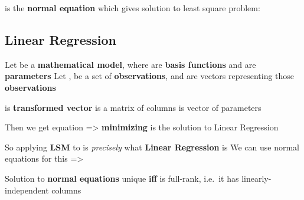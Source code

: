 \hSep %

 is the \textbf{normal
      equation} which gives solution to least square problem:

\subsection*{Linear Regression}

\begin{itemize}

      \vItem
            Let  be a
            \textbf{mathematical model}, where  are \textbf{basis
                  functions} and  are \textbf{parameters}
      \vItem
            Let ,  be a
            set of \textbf{observations}, and
             are vectors
            representing those \textbf{observations}

            \begin{itemize}

                  \vItem
                         is \textbf{transformed vector}
                  \vItem
                        is a matrix of columns
                  \vItem
                         is vector of
                        parameters
            \end{itemize}
      \vItem
            Then we get equation  =\textgreater{}
            \textbf{minimizing}
             is the
            solution to Linear Regression

            \begin{itemize}

                  \vItem
                        So applying \textbf{LSM} to  is
                        \emph{precisely} what \textbf{Linear Regression} is
                  \vItem
                        We can use normal equations for this =\textgreater{}
            \end{itemize}
      \vItem
            Solution to \textbf{normal equations} unique \textbf{iff}  is
            full-rank, i.e.~it has linearly-independent columns
\end{itemize}
